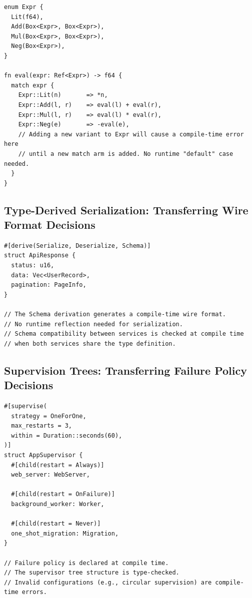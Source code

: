 \documentclass[11pt]{article}
\begin{document}
\begin{lstlisting}[caption={Exhaustive pattern matching as decision transfer in JAPL}]
enum Expr {
  Lit(f64),
  Add(Box<Expr>, Box<Expr>),
  Mul(Box<Expr>, Box<Expr>),
  Neg(Box<Expr>),
}

fn eval(expr: Ref<Expr>) -> f64 {
  match expr {
    Expr::Lit(n)       => *n,
    Expr::Add(l, r)    => eval(l) + eval(r),
    Expr::Mul(l, r)    => eval(l) * eval(r),
    Expr::Neg(e)       => -eval(e),
    // Adding a new variant to Expr will cause a compile-time error here
    // until a new match arm is added. No runtime "default" case needed.
  }
}
\end{lstlisting}

\subsection{Type-Derived Serialization: Transferring Wire Format Decisions}

\begin{lstlisting}[caption={Type-derived serialization as decision transfer in JAPL}]
#[derive(Serialize, Deserialize, Schema)]
struct ApiResponse {
  status: u16,
  data: Vec<UserRecord>,
  pagination: PageInfo,
}

// The Schema derivation generates a compile-time wire format.
// No runtime reflection needed for serialization.
// Schema compatibility between services is checked at compile time
// when both services share the type definition.
\end{lstlisting}

\subsection{Supervision Trees: Transferring Failure Policy Decisions}

\begin{lstlisting}[caption={Declarative supervision as decision transfer in JAPL}]
#[supervise(
  strategy = OneForOne,
  max_restarts = 3,
  within = Duration::seconds(60),
)]
struct AppSupervisor {
  #[child(restart = Always)]
  web_server: WebServer,

  #[child(restart = OnFailure)]
  background_worker: Worker,

  #[child(restart = Never)]
  one_shot_migration: Migration,
}

// Failure policy is declared at compile time.
// The supervisor tree structure is type-checked.
// Invalid configurations (e.g., circular supervision) are compile-time errors.
\end{lstlisting}
\end{document}
